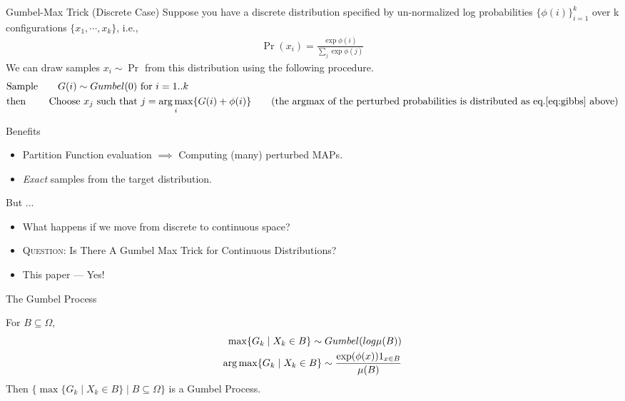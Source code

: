 \begin{frame}{Gumbel-Max Trick (Discrete Case)}
  Suppose you have a discrete distribution specified by un-normalized log probabilities $\{\phi(i)\}_{i=1}^{k}$ over k configurations $\{x_1,\cdots,x_k\}$, i.e.,
  \begin{align}
    \Pr(x_i) = \frac{\exp\phi(i)}{\sum_j\exp\phi(j)} \label{eq:gibbs}
  \end{align}
  We can draw samples $x_i \sim \Pr$ from this distribution using the following procedure.
  \begin{align*}
    & \text{Sample} \qquad G(i) \sim Gumbel(0) \text{ for } i=1..k\\
    & \text{then} \qquad \text{ Choose } x_j \text{ such that } j= \argmax_i \{G(i) +\phi(i)\} \tag{the argmax of the perturbed probabilities is distributed as eq.\ref{eq:gibbs} above}
  \end{align*}

\end{frame}

\begin{frame}{Benefits}
  \begin{itemize}[<+->]
  \item Partition Function evaluation $\implies$ Computing (many) perturbed MAPs. %
  \item \emph{Exact} samples from the target distribution. %
  \end{itemize}
  \pause
  But ...
  \begin{itemize}[<+->]
  \item What happens if we move from discrete to continuous space?
  \item \textsc{Question:} Is There A Gumbel Max Trick for Continuous Distributions?
  \item {\color{red} This paper --- Yes!}
  \end{itemize}
\end{frame}

\begin{frame}{The Gumbel Process}
  \begin{definition}
      For $B \subseteq \Omega$,
  \begin{align*}
    \max \{G_k \mid X_k \in B\} \sim Gumbel(log \mu(B)) \\
    \operatorname*{{arg\,max}} \{G_k \mid X_k \in B\} \sim \frac{\exp(\phi(x))1_{x \in B}}{\mu(B)} \\
  \end{align*}
  Then $\{ \max \{G_k \mid X_k \in B\} \mid B \subseteq \Omega\}$ is a Gumbel Process.
  \end{definition}\end{frame}


